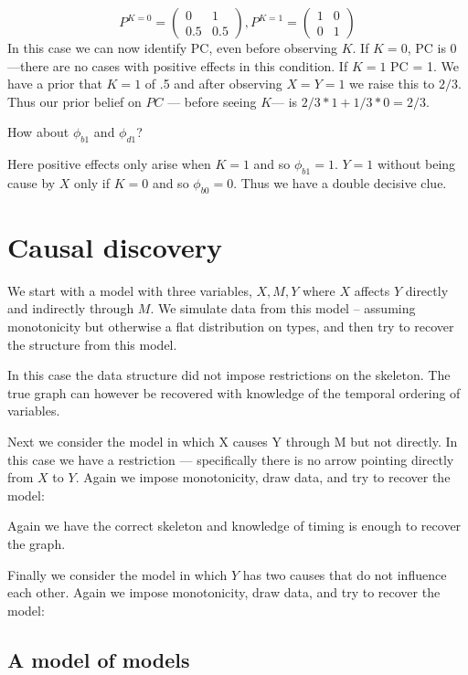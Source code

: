 \documentclass[
  12pt,
]{book}
\begin{document}
\[P^{K=0}=\left( \begin{array}{cc} 0 & 1 \\ 0.5 & 0.5 \end{array}\right), P^{K=1}=\left( \begin{array}{cc} 1 & 0 \\ 0 & 1 \end{array}\right)\]
In this case we can now identify PC, even before observing \(K\). If \(K=0\), PC is 0---there are no cases with positive effects in this condition. If \(K=1\) PC = 1. We have a prior that \(K=1\) of .5 and after observing \(X=Y=1\) we raise this to \(2/3\). Thus our prior belief on \(PC\) --- before seeing \(K\)--- is \(2/3 * 1 + 1/3 * 0 = 2/3\).

How about \(\phi_{b1}\) and \(\phi_{d1}\)?

Here positive effects only arise when \(K=1\) and so \(\phi_{b1} = 1\). \(Y=1\) without being cause by \(X\) only if \(K=0\) and so \(\phi_{b0} = 0\). Thus we have a double decisive clue.

\hypertarget{causal-discovery}{%
\section{Causal discovery}\label{causal-discovery}}

We start with a model with three variables, \(X,M,Y\) where \(X\) affects \(Y\) directly and indirectly through \(M\). We simulate data from this model -- assuming monotonicity but otherwise a flat distribution on types, and then try to recover the structure from this model.

In this case the data structure did not impose restrictions on the skeleton. The true graph can however be recovered with knowledge of the temporal ordering of variables.

Next we consider the model in which X causes Y through M but not directly. In this case we have a restriction --- specifically there is no arrow pointing directly from \(X\) to \(Y\). Again we impose monotonicity, draw data, and try to recover the model:

Again we have the correct skeleton and knowledge of timing is enough to recover the graph.

Finally we consider the model in which \(Y\) has two causes that do not influence each other. Again we impose monotonicity, draw data, and try to recover the model:

\hypertarget{a-model-of-models}{%
\subsection{A model of models}\label{a-model-of-models}}
\end{document}
